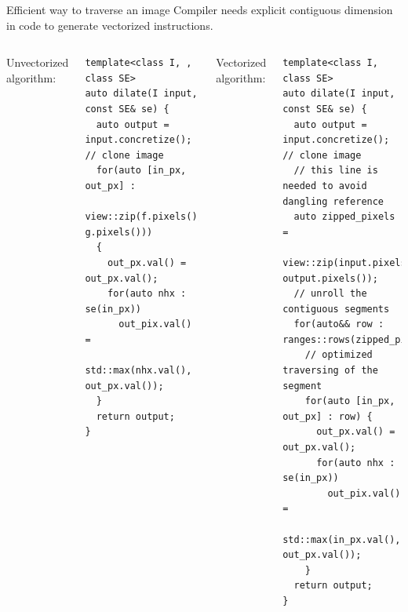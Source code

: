 \documentclass[12pt,aspectratio=169]{beamer}
\begin{document}
\begin{frame}[fragile]{Efficient way to traverse an image}
  Compiler needs explicit contiguous dimension in code to generate vectorized instructions.
  \begin{columns}[T,onlytextwidth]
    Unvectorized algorithm:
    \begin{verbatim}
template<class I, , class SE>
auto dilate(I input, const SE& se) {
  auto output = input.concretize(); // clone image
  for(auto [in_px, out_px] :
        view::zip(f.pixels(), g.pixels()))
  {
    out_px.val() = out_px.val();
    for(auto nhx : se(in_px))
      out_pix.val() =
        std::max(nhx.val(), out_px.val());
  }
  return output;
}
    \end{verbatim}
    Vectorized algorithm:
    \begin{verbatim}
template<class I, class SE>
auto dilate(I input, const SE& se) {
  auto output = input.concretize(); // clone image
  // this line is needed to avoid dangling reference
  auto zipped_pixels =
        view::zip(input.pixels(), output.pixels());
  // unroll the contiguous segments
  for(auto&& row : ranges::rows(zipped_pixels))
    // optimized traversing of the segment
    for(auto [in_px, out_px] : row) {
      out_px.val() = out_px.val();
      for(auto nhx : se(in_px))
        out_pix.val() =
          std::max(in_px.val(), out_px.val());
    }
  return output;
}
    \end{verbatim}
  \end{columns}
\end{frame}
\end{document}

